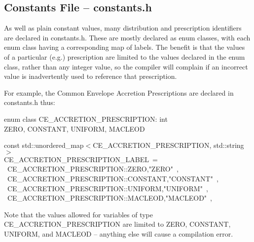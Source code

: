 \subsection{Constants File -- constants.h}\label{sec:ConstantsFile}

As well as plain constant values, many distribution and prescription identifiers are declared in constants.h.  These are mostly declared as enum classes, with each enum class having a corresponding map of labels.  The benefit is that the values of a particular (e.g.) prescription are limited to the values declared in the enum class, rather than any integer value, so the compiler will complain if an incorrect value is inadvertently used to reference that prescription.

For example, the Common Envelope Accretion Prescriptions are declared in constants.h thus:

\bigskip

\hfill
\begin{minipage}{\dimexpr\textwidth-2em}
    enum class CE\_ACCRETION\_PRESCRIPTION: int \lcb \\
    \tabto{2em}ZERO, CONSTANT, UNIFORM, MACLEOD \\
    \rcb{;}

    \medskip
    const std::unordered\_map$<$CE\_ACCRETION\_PRESCRIPTION, std::string$>$ \\ CE\_ACCRETION\_PRESCRIPTION\_LABEL\ =\ \lcb \\
    \tabto{2em}\lcb\ CE\_ACCRETION\_PRESCRIPTION::ZERO,\tabto{23.5em}"ZERO"\ \rcb, \\
    \tabto{2em}\lcb\ CE\_ACCRETION\_PRESCRIPTION::CONSTANT,\tabto{23.5em}"CONSTANT"\ \rcb, \\
    \tabto{2em}\lcb\ CE\_ACCRETION\_PRESCRIPTION::UNIFORM,\tabto{23.5em}"UNIFORM"\ \rcb, \\
    \tabto{2em}\lcb\ CE\_ACCRETION\_PRESCRIPTION::MACLEOD,\tabto{23.5em}"MACLEOD"\ \rcb, \\
    \rcb{;}
\end{minipage}

Note that the values allowed for variables of type CE\_ACCRETION\_PRESCRIPTION are limited to ZERO, CONSTANT, UNIFORM, and MACLEOD -- anything else will cause a compilation error.

